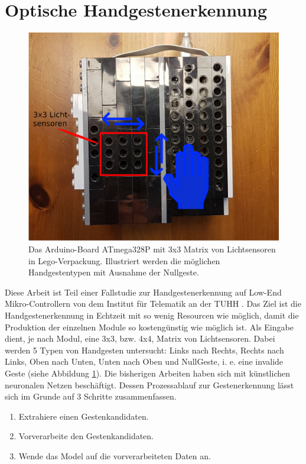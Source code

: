 \section{Optische Handgestenerkennung}
\label{sec:fallstudie}
\begin{figure}
    \centering
    \includegraphics[width=0.6\linewidth]{images/arduino_ex.png}
    \caption{Das Arduino-Board ATmega328P mit 3x3 Matrix von Lichtsensoren in Lego-Verpackung. Illustriert werden die möglichen Handgestentypen mit Ausnahme der Nullgeste.}
    \label{fig:arduino_ex}
\end{figure}
Diese Arbeit ist Teil einer Fallstudie zur Handgestenerkennung auf Low-End Mikro-Controllern von dem Institut für Telematik an der TUHH \cite{venzkeArticle}. Das Ziel ist die Handgestenerkennung in Echtzeit mit so wenig
Resourcen wie möglich, damit die Produktion der einzelnen Module so kostengünstig wie möglich ist. Als Eingabe dient, je nach Modul, eine 3x3, bzw. 4x4, Matrix von Lichtsensoren. Dabei werden 5 Typen von Handgesten
untersucht: Links nach Rechts, Rechts nach Links, Oben nach Unten, Unten nach Oben und NullGeste, i. e. eine invalide Geste (siehe Abbildung \ref{fig:arduino_ex}). Die bisherigen Arbeiten haben sich mit künstlichen
neuronalen Netzen beschäftigt. Dessen Prozessablauf zur Gestenerkennung lässt sich im Grunde auf 3 Schritte zusammenfassen.
\begin{enumerate}
    \item Extrahiere einen Gestenkandidaten.
    \item Vorverarbeite den Gestenkandidaten.
    \item Wende das Model auf die vorverarbeiteten Daten an.
\end{enumerate}






